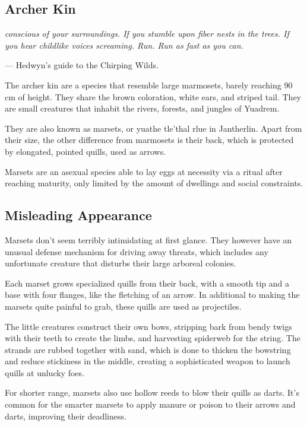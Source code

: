 \begin{linenumbers}

\section{Archer Kin}
\textit{conscious of your surroundings.
If you stumble upon fiber nests in the trees.
If you hear childlike voices screaming.
Run.
Run as fast as you can.}

\hspace*{\fill} --- Hedwyn's guide to the Chirping Wilds.

The archer kin are a species that resemble large marmosets, barely reaching 90 cm of height.
They share the brown coloration, white ears, and striped tail.
They are small creatures that inhabit the rivers, forests, and jungles of Yuadrem.

They are also known as marsets, or yuathe tle'thal rlue in Jantherlin.
Apart from their size, the other difference from marmosets is their back, which is protected by elongated, pointed quills, used as arrows.

Marsets are an asexual species able to lay eggs at necessity via a ritual after reaching maturity, only limited by the amount of dwellings and social constraints.

\subsection*{Misleading Appearance}
Marsets don't seem terribly intimidating at first glance.
They however have an unusual defense mechanism for driving away threats, which includes any unfortunate creature that disturbs their large arboreal colonies.

Each marset grows specialized quills from their back, with a smooth tip and a base with four flanges, like the fletching of an arrow.
In additional to making the marsets quite painful to grab, these quills are used as projectiles.

The little creatures construct their own bows, stripping bark from bendy twigs with their teeth to create the limbs, and harvesting spiderweb for the string.
The strands are rubbed together with sand, which is done to thicken the bowstring and reduce stickiness in the middle, creating a sophisticated weapon to launch quills at unlucky foes.

For shorter range, marsets also use hollow reeds to blow their quills as darts.
It's common for the smarter marsets to apply manure or poison to their arrows and darts, improving their deadliness.


\end{linenumbers}

